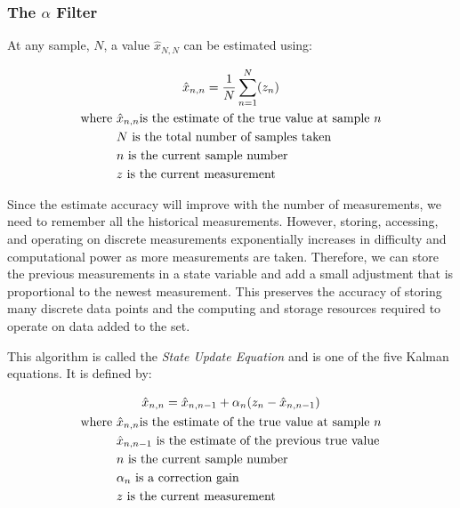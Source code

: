        \subsubsection*{The $\alpha$ Filter} At any sample, $N$, a value $\hat{x}_{N,N}$ can be estimated using:
        
        \begin{gather*} \labeq{sample_estimate}
            \hat{x}_{n,n} = \frac{1}{N} \sum_{n=1}^{N} (z_n) \\
            \begin{aligned}
                \text{where } &\hat{x}_{n,n} \text{is the estimate of the true value at sample $n$} \\
                &N \text{ is the total number of samples taken} \\
                &n \text{ is the current sample number} \\
                &z \text{ is the current measurement} \\
            \end{aligned} \notag
        \end{gather*}

        Since the estimate accuracy will improve with the number of measurements, we need to remember all the historical measurements.
        However, storing, accessing, and operating on discrete measurements exponentially increases in difficulty and computational power as more measurements are taken.
        Therefore, we can store the previous measurements in a state variable and add a small adjustment that is proportional to the newest measurement.
        This preserves the accuracy of storing many discrete data points and the computing and storage resources required to operate on data added to the set.

        This algorithm is called the \textit{State Update Equation} and is one of the five Kalman equations. 
        It is defined by:

        \begin{gather} \labeq{state_update_eq}
            \hat{x}_{n,n} = \hat{x}_{n,n-1} + \alpha_n(z_n - \hat{x}_{n,n-1}) \\
            \begin{aligned}
                \text{where } &\hat{x}_{n,n} \text{is the estimate of the true value at sample $n$} \\
                &\hat{x}_{n,n-1} \text{ is the estimate of the previous true value} \\
                &n \text{ is the current sample number} \\
                &\alpha_n \text{ is a correction gain} \\
                &z \text{ is the current measurement} \\
            \end{aligned} \notag
        \end{gather}


